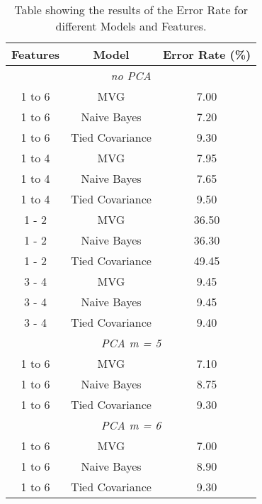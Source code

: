 \begin{table}
    \centering
    \begin{tabular}{c c c}
        \toprule
        \textbf{Features} & \textbf{Model}  & \textbf{Error Rate} (\%) \\
        \midrule
        \multicolumn{3}{c}{\textit{no PCA}} \\
        \midrule
        1 to 6            & MVG             & 7.00                     \\
        1 to 6            & Naive Bayes     & 7.20                     \\
        1 to 6            & Tied Covariance & 9.30                     \\
        \midrule
        1 to 4            & MVG             & 7.95                     \\
        1 to 4            & Naive Bayes     & 7.65                     \\
        1 to 4            & Tied Covariance & 9.50                     \\
        \midrule
        1 - 2             & MVG             & 36.50                    \\
        1 - 2             & Naive Bayes     & 36.30                    \\
        1 - 2             & Tied Covariance & 49.45                    \\
        \midrule
        3 - 4             & MVG             & 9.45                     \\
        3 - 4             & Naive Bayes     & 9.45                     \\
        3 - 4             & Tied Covariance & 9.40                     \\
        \midrule
        \multicolumn{3}{c}{\textit{PCA m = 5}} \\
        \midrule
        1 to 6            & MVG             & 7.10                     \\
        1 to 6            & Naive Bayes     & 8.75                     \\
        1 to 6            & Tied Covariance & 9.30                     \\
        \midrule
        \multicolumn{3}{c}{\textit{PCA m = 6}} \\
        \midrule
        1 to 6            & MVG             & 7.00                     \\
        1 to 6            & Naive Bayes     & 8.90                     \\
        1 to 6            & Tied Covariance & 9.30                     \\
        \bottomrule
    \end{tabular}
    \captionsetup{justification=justified,singlelinecheck=false,format=hang}
    \caption{Table showing the results of the Error Rate for different Models and Features.}
    \label{tab:resultGaussianClassificationModels}
\end{table}
